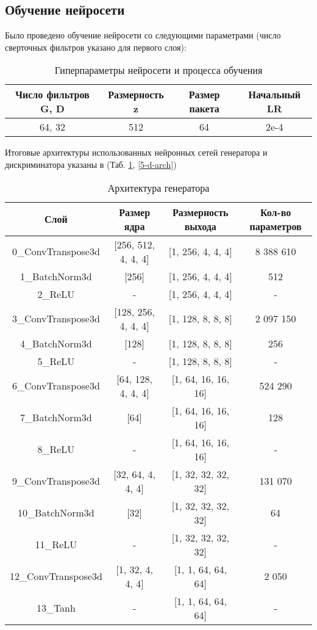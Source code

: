 	\subsection{Обучение нейросети}
		Было проведено обучение нейросети со следующими параметрами (число сверточных фильтров указано для первого слоя):
		\begin{table}[h]
			\centering
			\begin{tabular}{|c|c|c|c|}
				\hline
				Число фильтров G, D & Размерность z & Размер пакета & Начальный LR \\
				\hline
				64, 32 & 512 & 64 & 2e-4 \\
				\hline
			\end{tabular}
			\caption{Гиперпараметры нейросети и процесса обучения}
		\end{table}
	
		Итоговые архитектуры использованных нейронных сетей генератора и дискриминатора указаны в (Таб. \ref{5-g-arch}, \ref{5-d-arch})
		\begin{table}[h]
			\tabcolsep=0.11cm
			\centering
			\begin{tabular}{|c|c|c|c|}
				\hline
				Слой & Размер ядра & Размерность выхода & Кол-во параметров \\
				\hline
				0\_ConvTranspose3d &  [256, 512, 4, 4, 4] & [1, 256, 4, 4, 4] & 8 388 610 \\
				1\_BatchNorm3d &  [256] & [1, 256, 4, 4, 4] & 512 \\
				2\_ReLU & - & [1, 256, 4, 4, 4] & - \\
				\hline
				3\_ConvTranspose3d &  [128, 256, 4, 4, 4] & [1, 128, 8, 8, 8] & 2 097 150 \\
				4\_BatchNorm3d &  [128] & [1, 128, 8, 8, 8] & 256 \\
				5\_ReLU & - & [1, 128, 8, 8, 8] & - \\
				\hline
				6\_ConvTranspose3d &  [64, 128, 4, 4, 4] & [1, 64, 16, 16, 16] & 524 290 \\
				7\_BatchNorm3d &  [64] & [1, 64, 16, 16, 16] & 128 \\
				8\_ReLU & - & [1, 64, 16, 16, 16] & - \\
				\hline
				9\_ConvTranspose3d &  [32, 64, 4, 4, 4] & [1, 32, 32, 32, 32] & 131 070 \\
				10\_BatchNorm3d &  [32] & [1, 32, 32, 32, 32] & 64 \\
				11\_ReLU & - & [1, 32, 32, 32, 32] & - \\
				\hline
				12\_ConvTranspose3d &  [1, 32, 4, 4, 4] & [1, 1, 64, 64, 64] & 2 050 \\
				13\_Tanh & - & [1, 1, 64, 64, 64] & - \\
				\hline
			\end{tabular}
			\caption{Архитектура генератора}
			\label{5-g-arch}
		\end{table}
	
